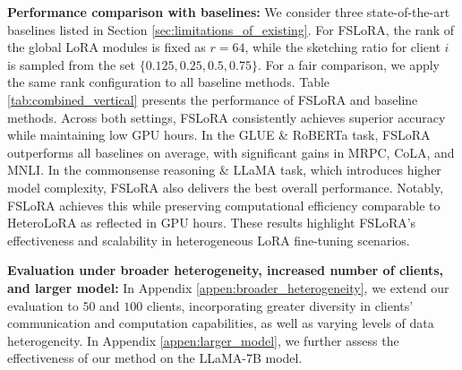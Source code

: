 \documentclass{article} %
\theoremstyle{plain}
\theoremstyle{definition}
\begin{document}
\textbf{Performance comparison with baselines:} 
We consider three state-of-the-art baselines listed in Section \ref{sec:limitations_of_existing}.
For FSLoRA, the rank of the global LoRA modules is fixed as $r=64$, while the sketching ratio for client $i$ is sampled from the set $\{0.125, 0.25, 0.5, 0.75\}$. For a fair comparison, we apply the same rank configuration to all baseline methods. 
Table \ref{tab:combined_vertical} presents the performance of FSLoRA and baseline methods.
Across both settings, FSLoRA consistently achieves superior accuracy while maintaining low GPU hours. In the GLUE \& RoBERTa task, FSLoRA outperforms all baselines on average, with significant gains in MRPC, CoLA, and MNLI. In the commonsense reasoning \& LLaMA task, which introduces higher model complexity, FSLoRA also delivers the best overall performance. 
Notably, FSLoRA achieves this while preserving computational efficiency comparable to HeteroLoRA as reflected in GPU hours.
These results highlight FSLoRA's effectiveness and scalability in heterogeneous LoRA fine-tuning scenarios.




\textbf{Evaluation under broader heterogeneity, increased number of clients, and larger model:} In Appendix \ref{appen:broader_heterogeneity}, we extend our evaluation to $50$ and $100$ clients, incorporating greater diversity in clients' communication and computation capabilities, as well as varying levels of data heterogeneity. In Appendix \ref{appen:larger_model}, we further assess the effectiveness of our method on the LLaMA-7B model.
\end{document}
